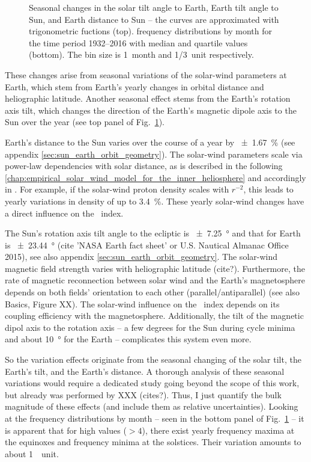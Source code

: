 \begin{figure}[htb]
\begin{floatrow}
{		}{
			\caption{Seasonal changes in the solar tilt angle to Earth, Earth tilt angle to Sun, and Earth distance to Sun -- the curves are approximated with trigonometric fuctions (top). \Kp{} frequency distributions by month for the time period 1932--2016 with median and quartile values (bottom). The bin size is 1~month and \SI{1/3}{\Kp}~unit respectively.}
			\label{fig:Kp_seasonal_c}
		}
	\end{floatrow}
\end{figure}
These \Kp{} changes arise from seasonal variations of the solar-wind parameters at Earth, which stem from Earth's yearly changes in orbital distance and heliographic latitude. Another seasonal effect stems from the Earth's rotation axis tilt, which changes the direction of the Earth's magnetic dipole axis to the Sun over the year (see top panel of Fig.~\ref{fig:Kp_seasonal_c}).

Earth's distance to the Sun varies over the course of a year by \SI{+-1.67}{\percent} (see appendix \autoref{sec:sun_earth_orbit_geometry}). The solar-wind parameters scale via power-law dependencies with solar distance, as is described in the following \autoref{chap:empirical_solar_wind_model_for_the_inner_heliosphere} and accordingly in \citet{Venzmer2017}. For example, if the solar-wind proton density scales with $r^{-2}$, this leads to yearly variations in density of up to \SI{3.4}{\percent}. These yearly solar-wind changes have a direct influence on the \Kp{}~index.

The Sun's rotation axis tilt angle to the ecliptic is \SI{+-7.25}{\degree} and that for Earth is \SI{+-23.44}{\degree} (cite 'NASA Earth fact sheet' or U.S. Nautical Almanac Office 2015), see also appendix \autoref{sec:sun_earth_orbit_geometry}. The solar-wind magnetic field strength varies with heliographic latitude (cite?). Furthermore, the rate of magnetic reconnection between solar wind and the Earth's magnetosphere depends on both fields' orientation to each other (parallel/antiparallel) (see also Basics, Figure XX). The solar-wind influence on the \Kp{}~index depends on its coupling efficiency with the magnetosphere. Additionally, the tilt of the magnetic dipol axis to the rotation axis -- a few degrees for the Sun during cycle minima and about \SI{10}{\degree} for the Earth -- complicates this system even more.

So the \Kp{} variation effects originate from the seasonal changing of the solar tilt, the Earth's tilt, and the Earth's distance. A thorough analysis of these seasonal variations would require a dedicated study going beyond the scope of this work, but already was performed by XXX (cites?). Thus, I just quantify the bulk magnitude of these effects (and include them as relative uncertainties). Looking at the \Kp{} frequency distributions by month -- seen in the bottom panel of Fig.~\ref{fig:Kp_seasonal_c} -- it is apparent that for high \Kp{} values ($>4$), there exist yearly frequency maxima at the equinoxes and frequency minima at the solstices. Their variation amounts to about 1~\Kp~unit.

